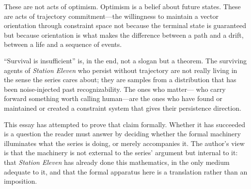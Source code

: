 \documentclass[12pt, oneside]{article}
\theoremstyle{plain}
\theoremstyle{definition}
\theoremstyle{remark}
\begin{document}
These are not acts of optimism. Optimism is a belief about future
states. These are acts of trajectory commitment---the willingness
to maintain a vector orientation through constraint space not
because the terminal state is guaranteed but because orientation
is what makes the difference between a path and a drift, between
a life and a sequence of events.

``Survival is insufficient'' is, in the end, not a slogan but a
theorem. The surviving agents of \textit{Station Eleven} who
persist without trajectory are not really living in the sense the
series cares about; they are samples from a distribution that has
been noise-injected past recognizability. The ones who matter---
who carry forward something worth calling human---are the ones who
have found or maintained or created a constraint system that gives
their persistence direction.

This essay has attempted to prove that claim formally. Whether it
has succeeded is a question the reader must answer by deciding
whether the formal machinery illuminates what the series is doing,
or merely accompanies it. The author's view is that the machinery
is not external to the series' argument but internal to it: that
\textit{Station Eleven} has already done this mathematics, in the
only medium adequate to it, and that the formal apparatus here
is a translation rather than an imposition.
\end{document}
